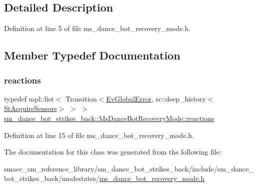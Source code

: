 \subsection{Detailed Description}


Definition at line 5 of file ms\+\_\+dance\+\_\+bot\+\_\+recovery\+\_\+mode.\+h.



\subsection{Member Typedef Documentation}
\mbox{\label{classsm__dance__bot__strikes__back_1_1MsDanceBotRecoveryMode_a4eb40cad98fb332413ed8c515b9c0cf2}} 
\subsubsection{\texorpdfstring{reactions}{reactions}}
{\footnotesize\ttfamily typedef mpl\+::list$<$ Transition$<$\hyperlink{structsm__dance__bot__strikes__back_1_1EvGlobalError}{Ev\+Global\+Error}, sc\+::deep\+\_\+history$<$\hyperlink{structsm__dance__bot__strikes__back_1_1StAcquireSensors}{St\+Acquire\+Sensors}$>$ $>$ $>$ \hyperlink{classsm__dance__bot__strikes__back_1_1MsDanceBotRecoveryMode_a4eb40cad98fb332413ed8c515b9c0cf2}{sm\+\_\+dance\+\_\+bot\+\_\+strikes\+\_\+back\+::\+Ms\+Dance\+Bot\+Recovery\+Mode\+::reactions}}



Definition at line 15 of file ms\+\_\+dance\+\_\+bot\+\_\+recovery\+\_\+mode.\+h.



The documentation for this class was generated from the following file\+:\begin{DoxyCompactItemize}
\item 
smacc\+\_\+sm\+\_\+reference\+\_\+library/sm\+\_\+dance\+\_\+bot\+\_\+strikes\+\_\+back/include/sm\+\_\+dance\+\_\+bot\+\_\+strikes\+\_\+back/modestates/\hyperlink{strikes__back_2include_2sm__dance__bot__strikes__back_2modestates_2ms__dance__bot__recovery__mode_8h}{ms\+\_\+dance\+\_\+bot\+\_\+recovery\+\_\+mode.\+h}\end{DoxyCompactItemize}
